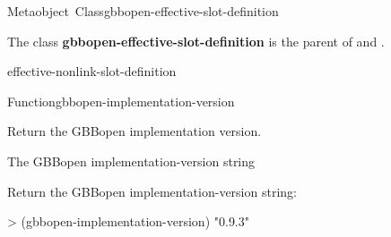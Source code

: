 \documentclass[10pt,twoside,english,pdftex]{article}
\begin{document}

\begin{functiondoc}{Metaobject~Class}{gbbopen-effective-slot-definition}{}
%

\fnsyntax

\fnpackage {}

\fnmodule {}

\fndescription The class \textbf{gbbopen-effective-slot-definition} is the
parent  of \textbf{} and
\textbf{}.
 
\begin{alsos}{effective-nonlink-slot-definition}
\end{alsos}

\end{functiondoc}


\begin{functiondoc}{Function}{gbbopen-implementation-version}{\noargs{}
\returns{} }
%
%

\fnsyntax

\fnpurpose Return the GBBopen implementation version.

\fnpackage {}

\fnmodule {}

\fnreturns The GBBopen implementation-version string

\fnexample
Return the GBBopen implementation-version string:
\begin{example}
> (gbbopen-implementation-version)
"0.9.3"
\end{example}

\end{functiondoc}

\end{document}
